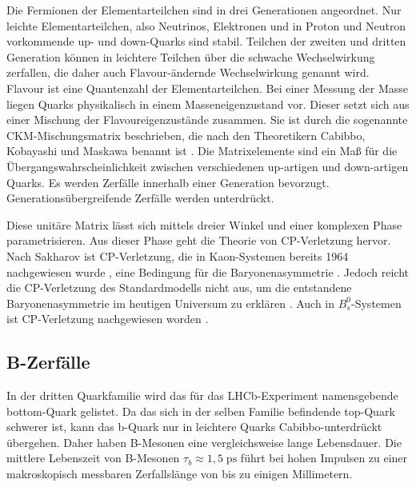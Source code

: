 \documentclass{article}
\begin{document}
Die Fermionen der Elementarteilchen sind in drei Generationen angeordnet. Nur leichte Elementarteilchen, also Neutrinos, Elektronen und in Proton und Neutron vorkommende up- und down-Quarks sind stabil. Teilchen der zweiten und dritten Generation können in leichtere Teilchen über die schwache Wechselwirkung zerfallen, die daher auch Flavour-ändernde Wechselwirkung genannt wird. Flavour ist eine Quantenzahl der Elementarteilchen. Bei einer Messung der Masse liegen Quarks physikalisch in einem Masseneigenzustand vor. Dieser setzt sich aus einer Mischung der Flavoureigenzustände zusammen. Sie ist durch die sogenannte CKM-Mischungsmatrix beschrieben, die nach den Theoretikern Cabibbo, Kobayashi und Maskawa benannt ist  \cite{Kobayashi1973}. Die Matrixelemente sind ein Maß für die Übergangswahrscheinlichkeit zwischen verschiedenen up-artigen und down-artigen Quarks. Es werden Zerfälle innerhalb einer Generation bevorzugt. Generationsübergreifende Zerfälle werden unterdrückt. 

Diese unitäre Matrix lässt sich mittels dreier Winkel und einer komplexen Phase parametrisieren. Aus dieser Phase geht die Theorie von CP-Verletzung hervor. Nach Sakharov ist CP-Verletzung, die in Kaon-Systemen bereits 1964 nachgewiesen wurde \cite{Cronin1964}, eine Bedingung für die Baryonenasymmetrie \cite{Sakharov1966}. Jedoch reicht die CP-Verletzung des Standardmodells nicht aus, um die entstandene Baryonenasymmetrie im heutigen Universum zu erklären \cite{cpv}. Auch in $B_s^0$-Systemen ist CP-Verletzung nachgewiesen worden \cite{CDF2006}. %


\subsection{B-Zerfälle}
In der dritten Quarkfamilie wird das für das LHCb-Experiment namensgebende bottom-Quark gelistet. Da das sich in der selben Familie befindende top-Quark schwerer ist, kann das b-Quark nur in leichtere Quarks Cabibbo-unterdrückt übergehen. Daher haben B-Mesonen eine vergleichsweise lange Lebensdauer. Die mittlere Lebenszeit von B-Mesonen $\tau_b \approx 1,5\;\text{ps}$  \cite{PDG} führt bei hohen Impulsen zu einer makroskopisch messbaren Zerfallslänge von bis zu einigen Millimetern. %
\end{document}
